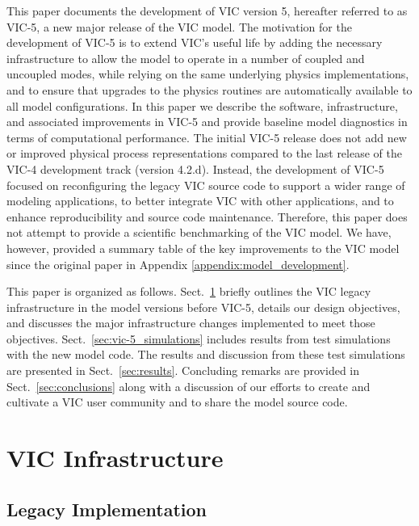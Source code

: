 \documentclass[gmd, manuscript]{copernicus}
\begin{document}
  This paper documents the development of VIC version 5, hereafter referred to as VIC-5, a new major release of the VIC model. The motivation for the development of VIC-5 is to extend VIC's useful life by adding the necessary infrastructure to allow the model to operate in a number of coupled and uncoupled modes, while relying on the same underlying physics implementations, and to ensure that upgrades to the physics routines are automatically available to all model configurations. In this paper we describe the software, infrastructure, and associated improvements in VIC-5 and provide baseline model diagnostics in terms of computational performance. The initial VIC-5 release does not add new or improved physical process representations compared to the last release of the VIC-4 development track (version 4.2.d). Instead, the development of VIC-5 focused on reconfiguring the legacy VIC source code to support a wider range of modeling applications, to better integrate VIC with other applications, and to enhance reproducibility and source code maintenance. Therefore, this paper does not attempt to provide a scientific benchmarking of the VIC model. We have, however, provided a summary table of the key improvements to the VIC model since the original \citet{Liang_1994} paper in Appendix \ref{appendix:model_development}.

  This paper is organized as follows. Sect.~\ref{sec:vic_infrastructure} briefly outlines the VIC legacy infrastructure in the model versions before VIC-5, details our design objectives, and discusses the major infrastructure changes implemented to meet those objectives. Sect.~\ref{sec:vic-5_simulations} includes results from test simulations with the new model code. The results and discussion from these test simulations are presented in Sect.~\ref{sec:results}. Concluding remarks are provided in Sect.~\ref{sec:conclusions} along with a discussion of our efforts to create and cultivate a VIC user community and to share the model source code.

\section{VIC Infrastructure}
  \label{sec:vic_infrastructure}
  \subsection{Legacy Implementation}
    \label{sec:vic_legacy}
\end{document}
